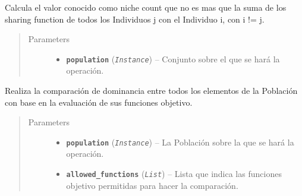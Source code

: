 \documentclass[class=report, crop=false]{standalone}
\begin{document}
\begin{fulllineitems}
\begin{fulllineitems}
\end{fulllineitems}

\begin{fulllineitems}

Calcula el valor conocido como niche count que no es 
mas que la suma de los sharing function de todos los 
Individuos j con el Individuo i, con i != j.

\begin{quote}\begin{description}
\item[{Parameters}] \leavevmode\begin{itemize}
\item \textbf{\texttt{population}} (\emph{\texttt{Instance}}) -- Conjunto sobre el que se hará la operación.
\end{itemize}
\end{description}\end{quote}

\end{fulllineitems}

\begin{fulllineitems}

Realiza la comparación de dominancia entre todos los elementos 
de la Población con base en la evaluación de sus funciones 
objetivo.

\begin{quote}\begin{description}
\item[{Parameters}] \leavevmode\begin{itemize}
\item \textbf{\texttt{population}} (\emph{\texttt{Instance}}) -- La Población sobre la que se hará la operación.
\item \textbf{\texttt{allowed\_functions}} (\emph{\texttt{List}}) -- Lista que indica las funciones objetivo permitidas para hacer la 
comparación.
\end{itemize}
\end{description}\end{quote}

\end{fulllineitems}


\end{fulllineitems}
\end{document}

